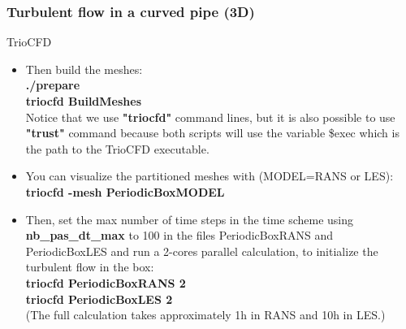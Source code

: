 \documentclass[10pt, hyperref={unicode=true,pdfusetitle, bookmarks=true,bookmarksnumbered=false,bookmarksopen=false, breaklinks=false,pdfborder={0 0 1},backref=true,colorlinks=true,linkcolor=darkblue,pageanchor}]{beamer}
\begin{document}
\begin{frame}
\frametitle{Turbulent flow in a curved pipe (3D)}
\begin{block}{TrioCFD}

\begin{itemize}
\item Then build the meshes:\\
\textbf{./prepare} \\
\textbf{triocfd BuildMeshes} \\
Notice that we use \textbf{"triocfd"} command lines, but it is also possible to use \textbf{"trust"} command because both scripts will use the variable \$exec which is the path to the TrioCFD executable.

\item You can visualize the partitioned meshes with (MODEL=RANS or LES): \\
\textbf{triocfd -mesh PeriodicBoxMODEL}

\item Then, set the max number of time steps in the time scheme using \textbf{nb\_pas\_dt\_max} to 100 in the files PeriodicBoxRANS and PeriodicBoxLES and run a 2-cores parallel calculation, to initialize the turbulent flow in the box: \\
\textbf{triocfd PeriodicBoxRANS 2} \\
\textbf{triocfd PeriodicBoxLES 2} \\
(The full calculation takes approximately 1h in RANS and 10h in LES.)
\end{itemize}

\end{block}
\end{frame}
\end{document}
